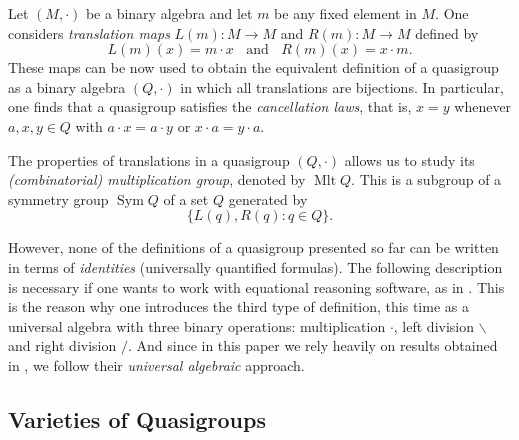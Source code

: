 \documentclass[11pt]{amsart}
\theoremstyle{definition}
\newcommand{\Mlt}{\mathop{\mathrm{Mlt}}}
\newcommand{\Sym}{\mathop{\mathrm{Sym}}}
\begin{document}
Let $(M,\cdot)$ be a binary algebra and let $m$ be any fixed element in $M$. One considers \emph{translation maps} $L(m)\colon M\to M$ and $R(m)\colon M\to M$ defined by
\begin{equation*}
L(m)(x)=m\cdot x \;\;\text{ and }  \;\;  R(m)(x)=x\cdot m.
\end{equation*}
These maps can be now used to obtain the equivalent definition of a quasigroup as a binary algebra $(Q,\cdot)$ in which all translations are bijections. In particular, one finds that a quasigroup satisfies the \emph{cancellation laws}, that is, $x=y$ whenever $a,x,y\in Q$ with $a\cdot x=a\cdot y$ or $x\cdot a=y\cdot a$.

The properties of translations in a quasigroup $(Q,\cdot)$ allows us to study its \emph{(combinatorial) multiplication group}, denoted by $\Mlt{Q}$. This is a subgroup of a symmetry group $\Sym{Q}$ of a set $Q$ generated by 
\begin{equation*}
 \{L(q),R(q)\colon q\in Q\}. 
\end{equation*}


However, none of the definitions of a quasigroup presented so far can be written in terms of \emph{identities} (universally quantified formulas). The following description is necessary if one wants to work with equational reasoning software, as in \cite{PhVo1}. This is the reason why one introduces the third type of definition, this time as a universal algebra with three binary operations: multiplication $\cdot$, left division $\backslash$ and right division $/$. And since in this paper we rely heavily on results obtained in \cite{PhVo1}, we follow their \emph{universal algebraic} approach.

\subsection{Varieties of Quasigroups}
\end{document}
